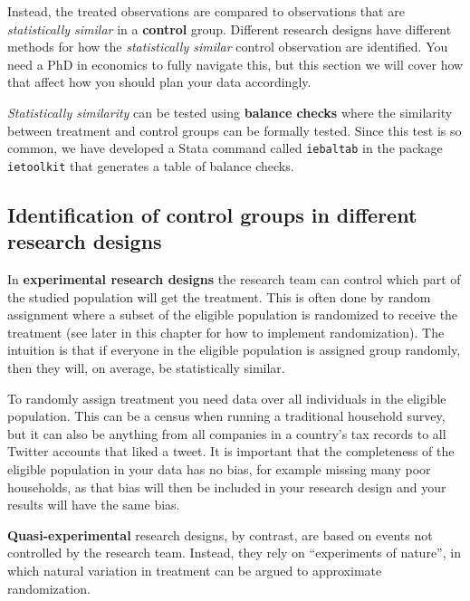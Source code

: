Instead, the treated observations are compared to observations
that are \textit{statistically similar} in a \textbf{control} group. 
Different research designs have different methods 
for how the \textit{statistically similar} control observation are identified. 
You need a PhD in economics to fully navigate this, 
but this section we will cover how that affect how you should plan your data accordingly.

\textit{Statistically similarity} can be tested using \textbf{balance checks} 
where the similarity between treatment and control groups can be formally tested. 
Since this test is so common, 
we have developed a Stata command called \texttt{iebaltab}
 in the package \texttt{ietoolkit} that generates a table of balance checks.


\subsection{Identification of control groups in different research designs}


In \textbf{experimental research designs} the research team can control which part of the studied population will get the treatment. 
This is often done by random assignment
where a subset of the eligible population is randomized to receive the treatment (see later in this chapter for how to implement randomization). 
The intuition is that if everyone in the eligible population is assigned group randomly, then they will, on average, be statistically similar.

To randomly assign treatment you need data over all individuals in the eligible population. 
This can be a census when running a traditional household survey, 
but it can also be anything from all companies in a country's tax records
to all Twitter accounts that liked a tweet.
It is important that the completeness of the eligible population in your data has no bias, 
for example missing many poor households, 
as that bias will then be included in your research design and your results will have the same bias.



\textbf{Quasi-experimental} research designs,
by contrast, are based on events not controlled by the research team. Instead, they rely on ``experiments of nature'',
in which natural variation in treatment can be argued to approximate randomization. 

